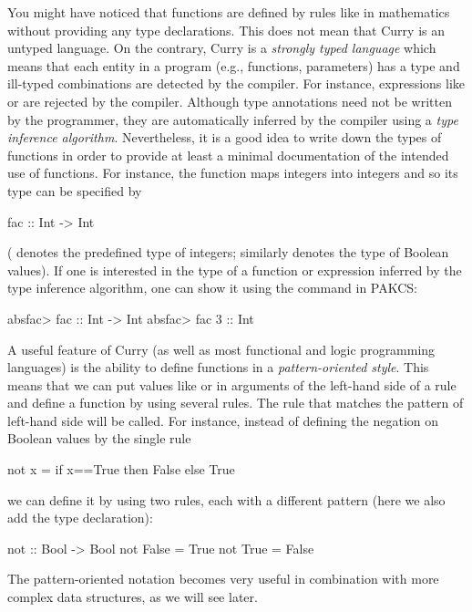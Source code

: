 You might have noticed that functions are defined by rules
like in mathematics without providing any type declarations.
This does not mean that Curry is an untyped language.  On the contrary, Curry is a \emph{strongly typed language}
which means that each entity in a program (e.g., functions, parameters)
has a type and ill-typed combinations are detected
by the compiler. For instance, expressions like
 or  are rejected by the compiler.
Although type annotations need not be written by the programmer,
they are automatically inferred by the compiler
using a \emph{type inference algorithm}.
Nevertheless, it is a good idea to write down the types
of functions in order to provide at least a minimal documentation
of the intended use of functions. For instance,
the function  maps integers into integers and so
its type can be specified by
\begin{curry}
fac :: Int -> Int
\end{curry}
( denotes the predefined type of integers; similarly
 denotes the type of Boolean values).
If one is interested in the type of a function or expression
inferred by the type inference algorithm, one can show it
using the command  in PAKCS:
\begin{prog}
absfac> 
fac :: Int -> Int
absfac> 
fac 3 :: Int
\end{prog}
%
A useful feature of Curry (as well as most functional and logic
programming languages) is the ability to define
functions in a \emph{pattern-oriented style}.
This means that we can put values like  or 
in arguments of the left-hand side of a rule
and define a function by using several rules.  The rule that matches the pattern of left-hand side will be called.   
For instance, instead of defining the negation on Boolean values by
the single rule
\begin{curry}
not x = if x==True then False
                   else True
\end{curry}
we can define it by using two rules, each with a different pattern (here we
also add the type declaration):
\begin{curry}
not :: Bool -> Bool
not False = True
not True  = False
\end{curry}
The pattern-oriented notation becomes very useful in combination
with more complex data structures, as we will see later.

